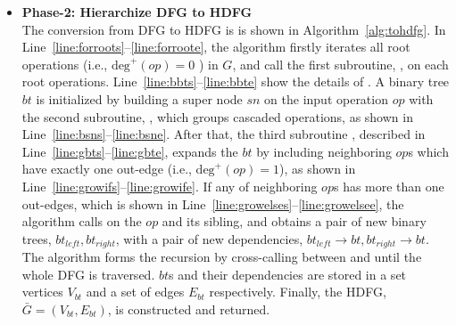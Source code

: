 \begin{itemize}
    \item \textbf{Phase-2: Hierarchize DFG to HDFG} \\\indent
        The conversion from DFG to HDFG is is shown in Algorithm~\ref{alg:tohdfg}.
        In Line~\ref{line:forroots}--\ref{line:forroote}, the algorithm firstly iterates all root operations (i.e., $\textrm{deg}^+(op)=0$ ) in $G$,
        and call the first subroutine, , on each root operations.
        Line~\ref{line:bbts}--\ref{line:bbte} show the details of .
        A binary tree $bt$ is initialized by building a super node $sn$ on the input operation $op$ with the second subroutine, 
        , which groups cascaded operations, as shown in Line~\ref{line:bsns}--\ref{line:bsne}.  
        After that, the third subroutine , described in Line~\ref{line:gbts}--\ref{line:gbte}, 
        expands the $bt$ by including neighboring $op$s which have exactly one out-edge (i.e., $\textrm{deg}^+(op)=1$), as shown in Line~\ref{line:growifs}--\ref{line:growife}.  
        If any of neighboring $op$s has more than one out-edges, 
        which is shown in Line~\ref{line:growelses}--\ref{line:growelsee}, 
        the algorithm calls  on the $op$ and its sibling, and obtains a pair of new binary trees, $bt_{left}, bt_{right}$, 
        with a pair of new dependencies, $bt_{left} \rightarrow bt, bt_{right} \rightarrow bt$.
        The algorithm forms the recursion by cross-calling between  and  until the whole DFG is traversed.
        $bt$s and their dependencies are stored in a set vertices $V_{bt}$ and a set of edges $E_{bt}$ respectively.
        Finally, the HDFG, $\bar{G} = ( V_{bt} , E_{bt} )$, is constructed and returned.
\end{itemize}

